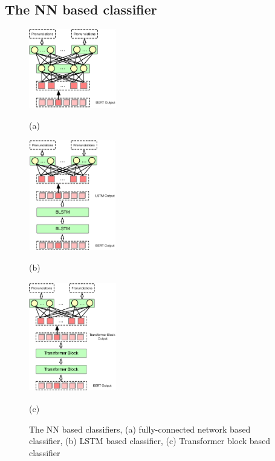 \documentclass[a4paper]{article}
\begin{document}
\subsection{The NN based classifier}
\begin{figure}[htbp]
		\centering

	\begin{minipage}[t]{0.3\linewidth}
		\centering
		\centerline{\includegraphics[width=1.5in]{pics3/FC22.eps}}
		\centerline{(a) \quad\quad}\medskip
		
	\end{minipage}%
	\begin{minipage}[t]{0.3\linewidth}
		\centering
		\includegraphics[width=1.5in, height=1.9in]{pics3/lstm2.eps}
		\centerline{(b)\quad\quad}\medskip
		
	\end{minipage}
	\begin{minipage}[t]{0.3\linewidth}
		\centering
		\includegraphics[width=1.5in, height=1.9in]{pics3/sa2.eps}
		\centerline{(c)\quad\quad}\medskip
		
	\end{minipage}
\caption{The NN based classifiers, (a) fully-connected network based classifier, (b) LSTM based classifier, (c) Transformer block based classifier }
\label{fig:cls}
\end{figure}
\end{document}
